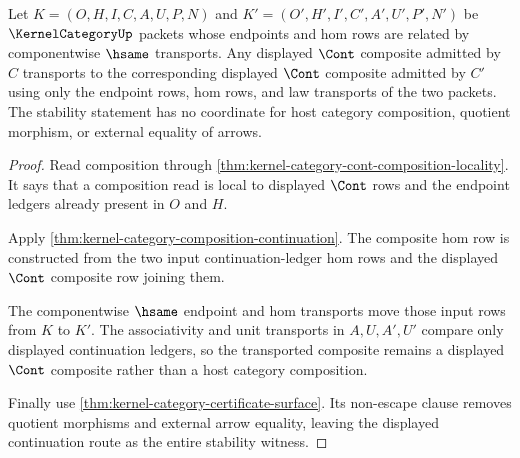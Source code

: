 \begin{theorem}
\label{thm:kernel-category-cont-composition-stability}
Let $K=(O,H,I,C,A,U,P,N)$ and $K'=(O',H',I',C',A',U',P',N')$ be
$\KernelCategoryUp$ packets whose endpoints and hom rows are related by
componentwise $\hsame$ transports. Any displayed $\Cont$ composite admitted by
$C$ transports to the corresponding displayed $\Cont$ composite admitted by
$C'$ using only the endpoint rows, hom rows, and law transports of the two
packets. The stability statement has no coordinate for host category
composition, quotient morphism, or external equality of arrows.
\end{theorem}
\begin{proof}
Read composition through \autoref{thm:kernel-category-cont-composition-locality}.
It says that a composition read is local to displayed $\Cont$ rows and the
endpoint ledgers already present in $O$ and $H$.

Apply \autoref{thm:kernel-category-composition-continuation}. The composite
hom row is constructed from the two input continuation-ledger hom rows and the
displayed $\Cont$ composite row joining them.

The componentwise $\hsame$ endpoint and hom transports move those input rows
from $K$ to $K'$. The associativity and unit transports in $A,U,A',U'$ compare
only displayed continuation ledgers, so the transported composite remains a
displayed $\Cont$ composite rather than a host category composition.

Finally use \autoref{thm:kernel-category-certificate-surface}. Its non-escape
clause removes quotient morphisms and external arrow equality, leaving the
displayed continuation route as the entire stability witness.
\end{proof}

